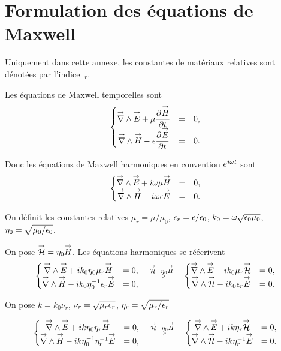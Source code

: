 \section{Formulation des équations de Maxwell}
\label{sec:annex:maxwell_equation}

Uniquement dans cette annexe, les constantes de matériaux relatives sont dénotées par l'indice \(~_r\).

Les équations de Maxwell temporelles sont
\begin{equation}
  \left\lbrace \begin{matrix}
  \vrot \vE + \mu \ddr{t}{\vect{H}} &=& 0,
  \\
  \vrot \vect{H} - \eps \ddr{t}{\vE} &=& 0.
  \end{matrix} \right.
\end{equation}

Donc les équations de Maxwell harmoniques en convention \(e^{i\w t}\) sont
\begin{equation}
  \left\lbrace \begin{matrix}
  \vrot \vE + i\w\mu \vect{H} &=& 0,
  \\
  \vrot \vect{H} - i\w\eps \vE &=& 0.
  \end{matrix} \right.
\end{equation}

On définit les constantes relatives \(\mu_r = \mu \slash \mu_0\), \(\eps_r = \eps \slash \eps_0\), \(k_0 = \w \sqrt {\eps_0\mu_0}\), \(\eta_0=\sqrt {\mu_0/\eps_0}\).

On pose \(\vH = \eta_0 \vect{H}\).
Les équations harmoniques se réécrivent
\begin{equation}
\left\lbrace \begin{matrix}
\vrot \vE + ik_0\eta_0\mu_r \vect{H} &= 0,
\\
\vrot \vect{H} - ik_0\eta_0^{-1}\eps_r \vE &= 0,
\end{matrix} \right.
\quad
\overset{\vH = \eta_0 \vect{H}}{\Rightarrow}
\quad
\left\lbrace \begin{matrix}
\vrot \vE + ik_0\mu_r \vH &= 0,
\\
\vrot \vH - ik_0\eps_r \vE &= 0.
\end{matrix} \right.
\end{equation}

On pose \(k=k_0\nu_r\), \(\nu_r = \sqrt{\mu_r\eps_r}\), \(\eta_r = \sqrt{\mu_r \slash \eps_r}\)

\begin{equation}
\left\lbrace \begin{matrix}
\vrot \vE + ik\eta_0\eta_r \vect{H} &= 0,
\\
\vrot \vect{H} - ik\eta_0^{-1}\eta_r^{-1} \vE &= 0,
\end{matrix} \right.
\quad
\overset{\vH = \eta_0 \vect{H}}{\Rightarrow}
\quad
\left\lbrace \begin{matrix}
\vrot \vE + ik\eta_r \vH &= 0,
\\
\vrot \vH - ik\eta_r^{-1} \vE &= 0.
\end{matrix} \right.
\end{equation}